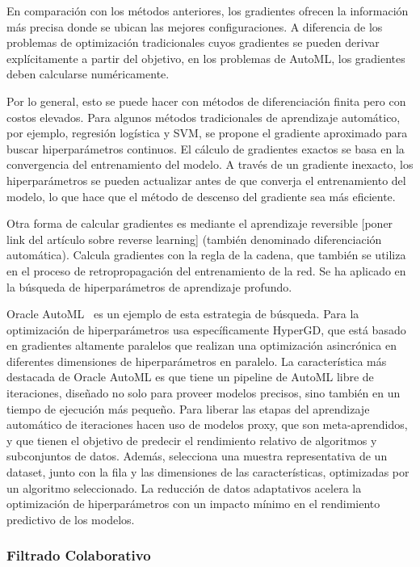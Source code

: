 En comparación con los métodos anteriores, los gradientes ofrecen la información más precisa donde se ubican las mejores configuraciones. A diferencia de los problemas de optimización tradicionales cuyos gradientes se pueden derivar explícitamente a partir del objetivo, en los problemas de AutoML, los gradientes deben calcularse numéricamente.

Por lo general, esto se puede hacer con métodos de diferenciación finita pero con costos elevados. Para algunos métodos tradicionales de aprendizaje automático, por ejemplo, regresión logística y SVM, se propone el gradiente aproximado para buscar hiperparámetros continuos. El cálculo de gradientes exactos se basa en la convergencia del entrenamiento del modelo. A través de un gradiente inexacto, los hiperparámetros se pueden actualizar antes de que converja el entrenamiento del modelo, lo que hace que el método de descenso del gradiente sea más eficiente.

Otra forma de calcular gradientes es mediante el aprendizaje reversible [poner link del artículo sobre reverse learning] (también denominado diferenciación automática). Calcula gradientes con la regla de la cadena, que también se utiliza en el proceso de retropropagación del entrenamiento de la red. Se ha aplicado en la búsqueda de hiperparámetros de aprendizaje profundo. 

Oracle AutoML~\cite{OracleAutoML} es un ejemplo de esta estrategia de búsqueda. Para la optimización de hiperparámetros usa específicamente HyperGD, que está basado en gradientes altamente paralelos que realizan una optimización asincrónica en diferentes dimensiones de hiperparámetros en paralelo. La característica más destacada de Oracle AutoML es que tiene un pipeline de AutoML libre de iteraciones, diseñado no solo para proveer modelos precisos, sino también en un tiempo de ejecución más pequeño. Para liberar las etapas del aprendizaje automático de iteraciones hacen uso de modelos proxy, que son meta-aprendidos, y que tienen el objetivo de predecir el rendimiento relativo de algoritmos y subconjuntos de datos. Además, selecciona una muestra representativa de un dataset, junto con la fila y las dimensiones de las características, optimizadas por un algoritmo seleccionado. La reducción de datos adaptativos acelera la optimización de hiperparámetros con un impacto mínimo en el rendimiento predictivo de los modelos.

\subsubsection{Filtrado Colaborativo}


